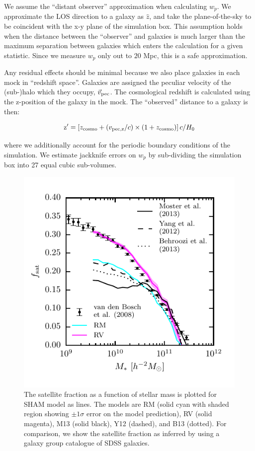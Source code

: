 \documentclass[a4paper,fleqn,usenatbib]{mnras}
\begin{document}
We assume the ``distant observer'' approximation when calculating $w_{p}$.  We approximate the LOS direction to a galaxy as $\hat{z}$, and take the plane-of-the-sky to be coincident with the x-y plane of the simulation box.  This assumption holds when the distance between the ``observer'' and galaxies is much larger than the maximum separation between galaxies which enters the calculation for a given statistic.  Since we measure $w_{p}$ only out to $20$ Mpc, this is a safe approximation.

Any residual effects should be minimal because we also place galaxies in each mock in ``redshift space''.  Galaxies are assigned the peculiar velocity of the (sub-)halo which they occupy, $\vec{v}_{\rm pec}$.  The cosmological redshift is calculated using the z-position of the galaxy in the mock.  The ``observed'' distance to a galaxy is then:
%
\begin{linenomath}
\begin{equation}
\mathrm{z}^{\prime} = \left[ z_{\rm cosmo} + ({v}_{\rm pec,z}/c) \times (1+ z_{\rm cosmo}) \right] c/H_0
\end{equation}
\end{linenomath}
%
where we additionally account for the periodic boundary conditions of the simulation.  We estimate jackknife errors on $w_p$ by sub-dividing the simulation box into 27 equal cubic sub-volumes.

\begin{figure}
    \includegraphics{figures/f_sat_mstar.pdf}
    \caption{The satellite fraction as a function of stellar mass is plotted for SHAM model as lines.  The models are RM (solid cyan with shaded region showing $\pm 1\sigma$ error on the model prediction), RV (solid magenta), M13 (solid black), Y12 (dashed), and B13 (dotted).  For comparison, we show the satellite fraction as inferred by \citet{vandenBosch:2008fv} using a galaxy group catalogue of SDSS galaxies.}
    \label{fig:f_sat_mstar}
\end{figure}
\end{document}
